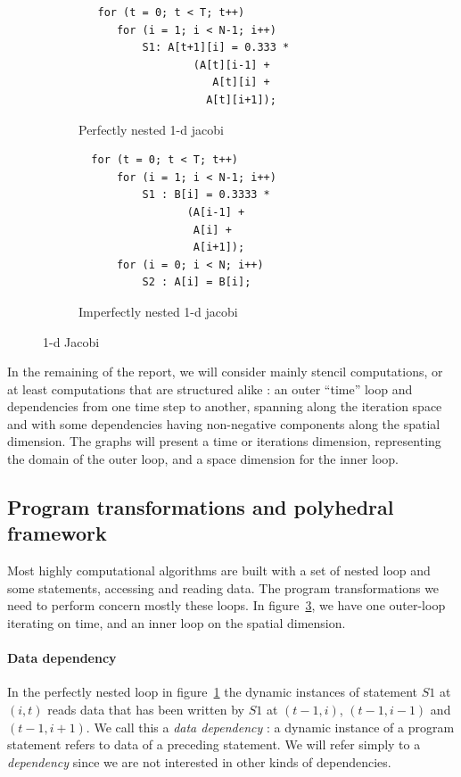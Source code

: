 \documentclass[a4paper,11pt]{article}
\begin{document}
\begin{figure}
 \begin{subfigure}{.5\textwidth}
  \begin{verbatim}
   for (t = 0; t < T; t++)
      for (i = 1; i < N-1; i++)
          S1: A[t+1][i] = 0.333 *
                  (A[t][i-1] +
                     A[t][i] +
                    A[t][i+1]);
  \end{verbatim}
  \caption{Perfectly nested 1-d jacobi}
  \label{jbi1d_code:naive} 
 \end{subfigure}
 \begin{subfigure}{.5\textwidth}
  \begin{verbatim}
  for (t = 0; t < T; t++)
      for (i = 1; i < N-1; i++)
          S1 : B[i] = 0.3333 * 
                 (A[i-1] + 
                  A[i] + 
                  A[i+1]);
      for (i = 0; i < N; i++)
          S2 : A[i] = B[i];   
  \end{verbatim}
  \caption{Imperfectly nested 1-d jacobi}
  \label{jbi1d_code:mem}
 \end{subfigure}
 \caption{1-d Jacobi}
 \label{jbi1d_code}
\end{figure}

In the remaining of the report, we will consider mainly stencil computations, or at least 
computations that are structured alike : an outer “time” loop and dependencies from 
one time step to another, spanning along the iteration space and with some dependencies having
non-negative components along the spatial dimension. The graphs will present a 
time or iterations dimension, representing the domain of the outer loop, and a space dimension
for the inner loop.


\subsection{Program transformations and polyhedral framework}
Most highly computational algorithms are built with a set of nested loop and some statements, 
accessing and reading data. The program transformations we need to perform
concern mostly these loops. In figure~\ref{jbi1d_code}, we have one outer-loop iterating on 
time, and an inner loop on the spatial dimension.
\paragraph{Data dependency} In the perfectly nested loop in figure~\ref{jbi1d_code:naive} the
dynamic instances of statement $S1$ at $(i, t)$ reads data that has been written by $S1$ at 
$(t − 1, i)$, $(t − 1, i − 1)$ and $(t − 1, i + 1)$. We call this a \textit{data dependency} :
a dynamic instance of a program statement refers to data of a preceding statement. We will refer 
simply to a \textit{dependency} since we are not interested in other kinds of dependencies.
\end{document}
